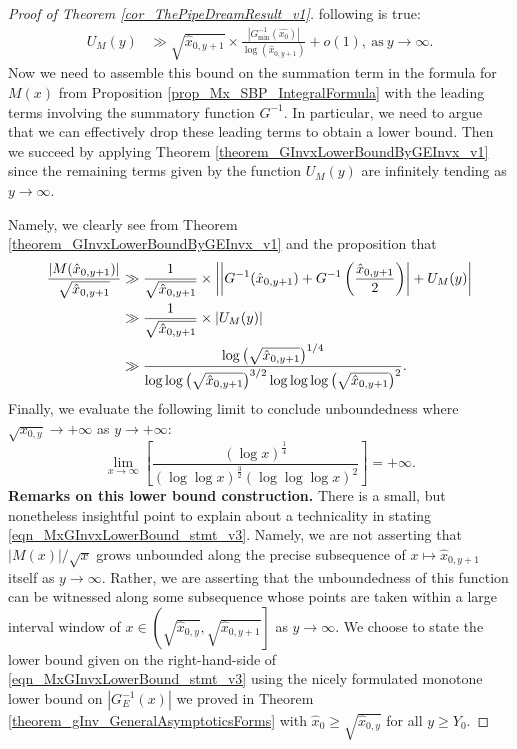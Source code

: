 \documentclass[11pt,reqno,a4letter]{article}
\numberwithin{figure}{section}
\numberwithin{table}{section}
\theoremstyle{plain}
\numberwithin{theorem}{section}
\theoremstyle{definition}
\begin{document}
\begin{proof}[Proof of Theorem \ref{cor_ThePipeDreamResult_v1}]
following is true: 
\begin{align*} 
U_M(y) & \gg \sqrt{\hat{x}_{0,y+1}} \times 
     \frac{|G_{\min}^{-1}(\hat{x_0})|}{\log(\hat{x}_{0,y+1})} 
     + o(1), \mathrm{\ as\ } y \rightarrow \infty. 
\end{align*} 
Now we need to assemble this bound on the summation term in the 
formula for $M(x)$ from 
Proposition \ref{prop_Mx_SBP_IntegralFormula} with the 
leading terms involving the summatory function $G^{-1}$. 
In particular, we need to argue that we can effectively drop these leading terms to 
obtain a lower bound. Then we succeed by applying 
Theorem \ref{theorem_GInvxLowerBoundByGEInvx_v1} since the remaining terms given by the 
function $U_M(y)$ are infinitely tending as $y \rightarrow \infty$. 

Namely, we clearly see from Theorem \ref{theorem_GInvxLowerBoundByGEInvx_v1} and the 
proposition that 
\begin{align} 
\notag 
\frac{|M(\hat{x}_{0,y+1})|}{\sqrt{\hat{x}_{0,y+1}}} & \gg \frac{1}{\sqrt{\hat{x}_{0,y+1}}} \times 
     \left\lvert \left\lvert 
     G^{-1}(\hat{x}_{0,y+1}) + G^{-1}\left(\frac{\hat{x}_{0,y+1}}{2}\right) \right\rvert + 
     U_M(y) \right\rvert \\ 
\notag 
     & \gg \frac{1}{\sqrt{\hat{x}_{0,y+1}}} \times \left\lvert U_M(y) \right\rvert \\ 
\label{eqn_MxGInvxLowerBound_stmt_v3} 
     & \gg \frac{\log\left(\sqrt{\hat{x}_{0,y+1}}\right)^{1/4}}{
     \log\log\left(\sqrt{\hat{x}_{0,y+1}}\right)^{3/2} 
     \log\log\log\left(\sqrt{\hat{x}_{0,y+1}}\right)^{2}}. 
\end{align} 
Finally, we evaluate the following limit to conclude unboundedness 
where $\sqrt{x_{0,y}} \rightarrow +\infty$ as $y \rightarrow +\infty$: 
\[
\lim_{x \rightarrow \infty} \left[\frac{(\log x)^{\frac{1}{4}} 
     }{(\log\log x)^{\frac{3}{2}} (\log\log\log x)^2}  
     \right] = +\infty. 
\] 
\textbf{Remarks on this lower bound construction.} 
There is a small, but nonetheless insightful point to explain about a 
technicality in stating \eqref{eqn_MxGInvxLowerBound_stmt_v3}. 
Namely, we are not asserting that 
$|M(x)| / \sqrt{x}$ grows unbounded along the precise subsequence of 
$x \mapsto \hat{x}_{0,y+1}$ itself as $y \rightarrow \infty$. 
Rather, we are asserting that the unboundedness of this function 
can be witnessed along some subsequence whose points are taken within a 
large interval window of 
$x \in \left(\sqrt{\hat{x}_{0,y}}, \sqrt{\hat{x}_{0,y+1}}\right]$ as 
$y \rightarrow \infty$. 
We choose to state the lower bound given on the right-hand-side of 
\eqref{eqn_MxGInvxLowerBound_stmt_v3} using the nicely formulated 
monotone lower bound on $|G_E^{-1}(x)|$ we proved in 
Theorem \ref{theorem_gInv_GeneralAsymptoticsForms} 
with $\hat{x}_0 \geq \sqrt{\hat{x}_{0,y}}$ for all $y \geq Y_0$. 
\end{proof} 
\end{document}

